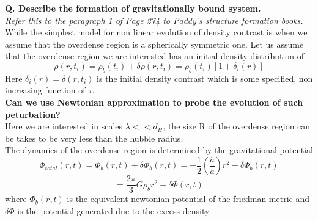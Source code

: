 \documentclass[12pt]{report}
\newcommand{\tbf}[1]{\textbf{#1}}
\newcommand{\tit}[1]{\textit{#1}}
\newcommand{\cc}[1]{\left({#1}\right)}
\newcommand{\rr}[1]{\left[{#1}\right]}
\begin{document}
\tbf{Q. Describe the formation of gravitationally bound system.}\\

\tit{Refer this to the paragraph 1 of Page 274 to Paddy's structure formation books.}\\
\medskip
While the simplest model for non linear evolution of density contrast is when we assume that the overdense region is a spherically symmetric one. Let us assume that the overdense region we are interested has an initial density distribution of 
\begin{equation}
\rho(r,t_i)=\rho_{b}(t_i)+\delta \rho(r,t_i)=\rho_b(t_i)\rr{1+\delta_i(r)}
\end{equation} 
Here $\delta_i(r)=\delta(r,t_i)$ is the initial density contrast which is some specified, non increasing function of $\tau$.\\

\tbf{Can we use Newtonian approximation to probe the evolution of such peturbation?}\\

Here we are interested in scales $\lambda<<d_H$, the size R of the overdense region can be takes to be very less than the hubble radius.\\
The dynamics of the overdense region is determined by the gravitational potential
\begin{equation*}
\Phi_{total}(r,t)=\Phi_{b}(r,t)+\delta \Phi_{b}(r,t)=-\frac{1}{2}\cc{\frac{\ddot{a}}{a}}r^2+\delta \Phi_{b}(r,t)
\end{equation*}
\begin{equation}
=\frac{2\pi}{3}G \rho_b r^2+\delta \Phi(r,t)
\end{equation} 
where $\Phi_b(r,t)$ is the equivalent newtonian potential of the friedman metric and $\delta \Phi$ is the potential generated due to the excess density.\\
\end{document}
